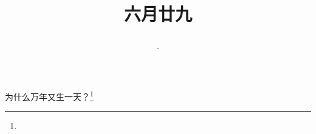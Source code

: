 \title{\date[d=3,m=8,y=2024][year:cn-y,年,month:cn,day:cn,日,·,weekday]·六月廿九 }
为什么万年又生一天？\footnote{ }

